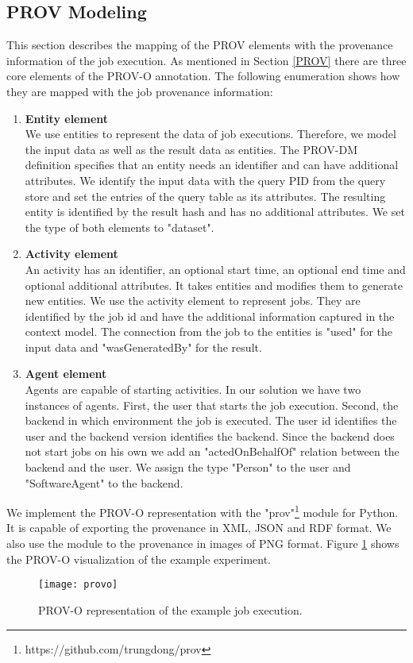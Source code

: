 \documentclass[draft,final]{vutinfth} %
\begin{document}
{
\subsection{PROV Modeling}\label{Implementation:PROV-O}

This section describes the mapping of the PROV elements with the provenance information of the job execution. As mentioned in Section \ref{PROV} there are three core elements of the PROV-O annotation. The following enumeration shows how they are mapped with the job provenance information:

\begin{enumerate}
	\item \textbf{Entity element} \\
	We use entities to represent the data of job executions. Therefore, we model the input data as well as the result data as entities. The PROV-DM definition specifies that an entity needs an identifier and can have additional attributes. We identify the input data with the query PID from the query store and set the entries of the query table as its attributes. The resulting entity is identified by the result hash and has no additional attributes. We set the type of both elements to "dataset".
	\item \textbf{Activity element} \\  
	An activity has an identifier, an optional start time, an optional end time and optional additional attributes. It takes entities and modifies them to generate new entities. We use the activity element to represent jobs. They are identified by the job id and have the additional information captured in the context model. The connection from the job to the entities is "used" for the input data and "wasGeneratedBy" for the result.
	\item \textbf{Agent element} \\
	Agents are capable of starting activities. In our solution we have two instances of agents. First, the user that starts the job execution. Second, the backend in which environment the job is executed. The user id identifies the user and the backend version identifies the backend. Since the backend does not start jobs on his own we add an "actedOnBehalfOf" relation between the backend and the user. We assign the type "Person" to the user and "SoftwareAgent" to the backend.    
\end{enumerate}

We implement the PROV-O representation with the "prov"\footnote{https://github.com/trungdong/prov} module for Python. It is capable of exporting the provenance in XML, JSON and RDF format. We also use the module to  the provenance in images of PNG format. Figure \ref{fig:impl_provo} shows the PROV-O visualization of the example experiment. 
}
\begin{figure}[h]
	\centering
	\texttt{[image: provo]}
	\caption{PROV-O representation of the example job execution.}
	\label{fig:impl_provo} %
\end{figure}
\newpage
\end{document}
